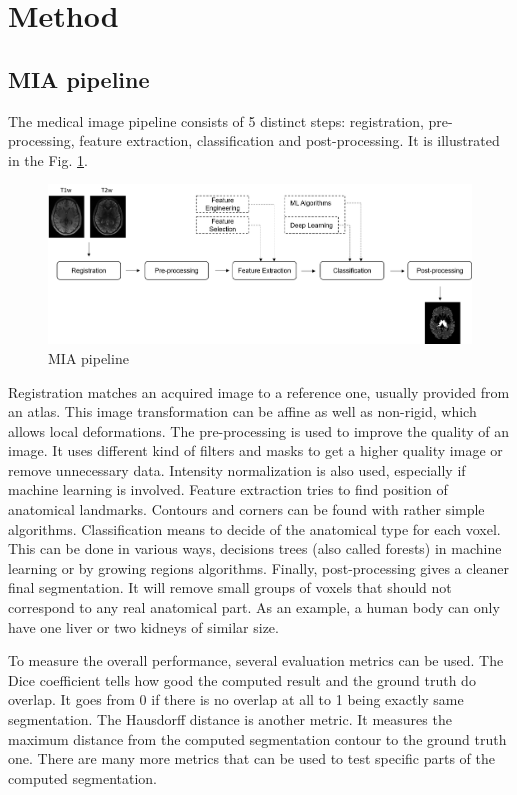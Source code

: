 \section*{Method}

\subsection*{MIA pipeline}
The medical image pipeline consists of 5 distinct steps: registration, pre-processing, feature extraction, classification and post-processing. It is illustrated in the Fig. \ref{fig:pipeline}.

\begin{figure}[h!]
	\centering
	\includegraphics[width = .45 \textwidth]{img/pipeline}
	\caption{MIA pipeline}
	\label{fig:pipeline}
\end{figure}

Registration matches an acquired image to a reference one, usually provided from an atlas. This image transformation can be affine as well as non-rigid, which allows local deformations. The pre-processing is used to improve the quality of an image. It uses different kind of filters and masks to get a higher quality image or remove unnecessary data. Intensity normalization is also used, especially if machine learning is involved. Feature extraction tries to find position of anatomical landmarks. Contours and corners can be found with rather simple algorithms. Classification means to decide of the anatomical type for each voxel. This can be done in various ways, decisions trees (also called forests) in machine learning or by growing regions algorithms. Finally, post-processing gives a cleaner final segmentation. It will remove small groups of voxels that should not correspond to any real anatomical part. As an example, a human body can only have one liver or two kidneys of similar size.

To measure the overall performance, several evaluation metrics can be used. The Dice coefficient tells how good the computed result and the ground truth do overlap. It goes from 0 if there is no overlap at all to 1 being exactly same segmentation. The Hausdorff distance is another metric. It measures the maximum distance from the computed segmentation contour to the ground truth one. There are many more metrics that can be used to test specific parts of the computed segmentation.

